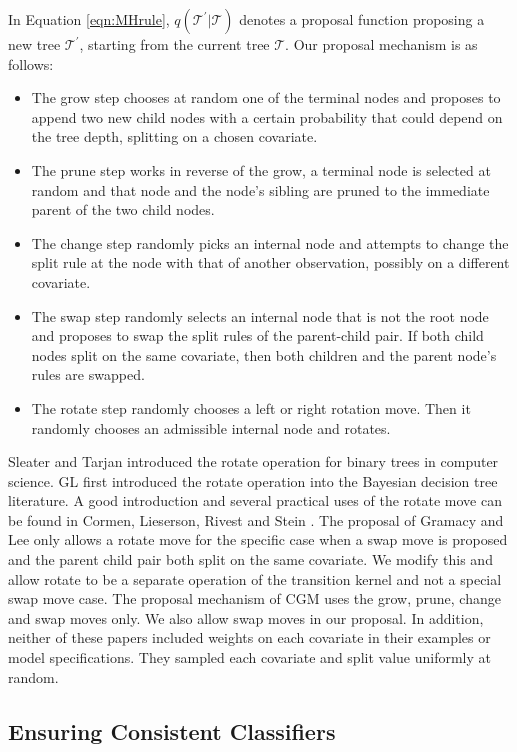  In Equation \ref{eqn:MHrule}, $q(\mathcal{T}^\prime\vert\mathcal{T})$ denotes a proposal function proposing a new tree $\mathcal{T}^\prime$, starting from the current tree $\mathcal{T}$. 
 Our proposal mechanism is as follows:
  \begin{itemize}
 \item The grow step chooses at random one of the terminal nodes and proposes to append two new child nodes with a certain probability that could depend on the tree depth, splitting on a chosen covariate.
 \item The prune step works in reverse of the grow, a terminal node is selected at random and that node and the node's sibling are pruned to the immediate parent of the two child nodes.
 \item The change step randomly picks an internal node and attempts to change the split rule at the node with that of another observation, possibly on a different covariate.
  \item The swap step randomly selects an internal node that is not the root node and proposes to swap the split rules of the parent-child pair. If both child nodes split on the same covariate, then both children and the parent node's rules are swapped.
  \item The rotate step randomly chooses a left or right rotation move. Then it randomly chooses an admissible internal node and rotates.
 \end{itemize}
 Sleater and Tarjan \cite{sleator1985self} introduced the rotate operation for binary trees in computer science. GL \cite{gramacy2008bayesian} first introduced the rotate operation into the Bayesian decision tree literature. A good introduction and several practical uses of the rotate move can be found in Cormen, Lieserson, Rivest and Stein \cite{cormen2001introduction}. The proposal of Gramacy and Lee \cite{gramacy2008bayesian} only allows a rotate move for the specific case when a swap move is proposed and the parent child pair both split on the same covariate. We modify this and allow rotate to be a separate operation of the transition kernel and not a special swap move case. The proposal mechanism of CGM uses the grow, prune, change and swap moves only. We also allow swap moves in our proposal. In addition, neither of these papers included weights on each covariate in their examples or model specifications. They sampled each covariate and split value uniformly at random. 

\subsection{Ensuring Consistent Classifiers}\label{sec:ecc}


